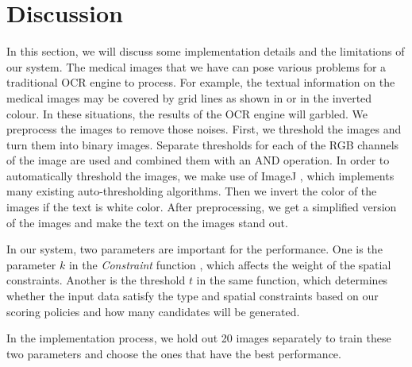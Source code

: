 \section{Discussion}
\label{sec:discuss}
In this section, we will discuss some implementation details
and the limitations of our system. 
The medical images that we have can pose various problems 
for a traditional OCR engine to process. For example, 
the textual information on the medical images may be 
covered by grid lines as shown in  or 
in the inverted colour. In these situations, the results of 
the OCR engine will garbled. We preprocess the 
images to remove those noises. First, we threshold the 
images and turn them into binary images. 
Separate thresholds for each of the RGB channels of the image 
are used and combined them with an AND operation. 
In order to automatically threshold the images, 
we make use of ImageJ \cite{schneider2012671}, which implements many
existing auto-thresholding algorithms. 
Then we invert the color of the images if the text 
is white color. 
After preprocessing, we get a simplified version of the 
images and make the text on the images stand out. 

%

In our system, two parameters are important for the 
performance. 
One is the parameter $k$ in the {\em Constraint} function 
, which affects the weight of 
the spatial constraints.
Another is the threshold $t$ in the same function, which 
determines whether the input data satisfy the 
type and spatial constraints based on our scoring policies 
and how many candidates will be generated.  

In the implementation process, 
we hold out 20 images separately to train these two parameters 
and choose the ones that have the best performance. 

